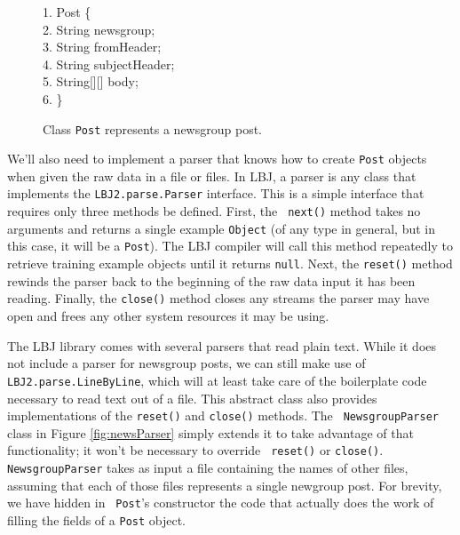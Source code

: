 \begin{figure}[t]
\begin{code}
1.  Post \{\\
2. \> {\color{BrickRed} String} newsgroup; \\
3. \> {\color{BrickRed} String} fromHeader;\\
4. \> {\color{BrickRed} String} subjectHeader;\\
5. \> {\color{BrickRed} String}[][] body;\\
6. \>\}
\end{code}
\caption{Class {\tt Post} represents a newsgroup post.}
\label{fig:post}
\end{figure}

We'll also need to implement a parser that knows how to create {\tt Post}
objects when given the raw data in a file or files.  In LBJ, a parser is any
class that implements the {\tt LBJ2.parse.Parser} interface.  This is a simple
interface that requires only three methods be defined.  First, the {\tt
next()} method takes no arguments and returns a single example {\tt Object}
(of any type in general, but in this case, it will be a {\tt Post}).  The LBJ
compiler will call this method repeatedly to retrieve training example objects
until it returns {\tt null}.  Next, the {\tt reset()} method rewinds the
parser back to the beginning of the raw data input it has been reading.
Finally, the {\tt close()} method closes any streams the parser may have open
and frees any other system resources it may be using.

The LBJ library comes with several parsers that read plain text.  While it
does not include a parser for newsgroup posts, we can still make use of {\tt
LBJ2.parse.LineByLine}, which will at least take care of the boilerplate code
necessary to read text out of a file.  This abstract class also provides
implementations of the {\tt reset()} and {\tt close()} methods.  The {\tt
NewsgroupParser} class in Figure \ref{fig:newsParser} simply extends it to
take advantage of that functionality; it won't be necessary to override {\tt
reset()} or {\tt close()}.  {\tt NewsgroupParser} takes as input a file
containing the names of other files, assuming that each of those files
represents a single newgroup post.  For brevity, we have hidden in {\tt
Post}'s constructor the code that actually does the work of filling the fields
of a {\tt Post} object.

